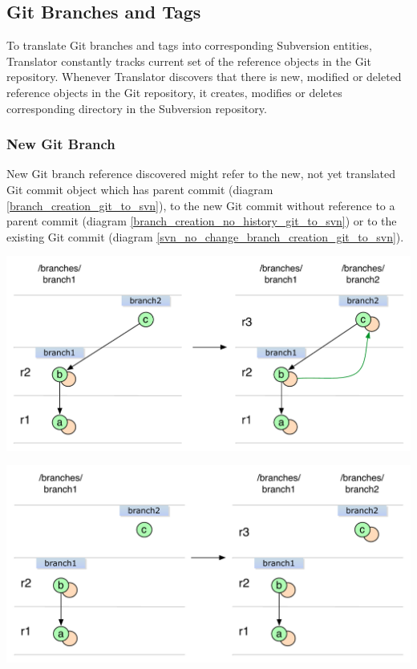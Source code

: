 \subsection{Git Branches and Tags}

To translate Git branches and tags into corresponding Subversion entities, Translator
constantly tracks current set of the reference objects in the Git repository. Whenever %
Translator discovers that there is new, modified or deleted reference objects in the Git 
repository, it creates, modifies or deletes corresponding directory in the Subversion repository.
\subsubsection{New Git Branch}

New Git branch reference discovered might refer to the new, not yet translated Git commit object
which has parent commit (diagram \ref{branch_creation_git_to_svn}), to the new Git commit without
reference to a parent commit (diagram \ref{branch_creation_no_history_git_to_svn}) or to the 
existing Git commit (diagram \ref{svn_no_change_branch_creation_git_to_svn}).

\begin{center}
\includegraphics[width=\textwidth]{img/diagrams/branch_creation_git_to_svn.pdf}%
\label{branch_creation_git_to_svn}%
\end{center}

\begin{center}
\includegraphics[width=\textwidth]{img/diagrams/branch_creation_no_history_git_to_svn.pdf}%
\label{branch_creation_no_history_git_to_svn}%
\end{center}


